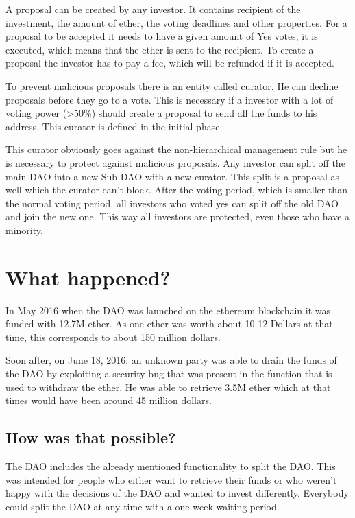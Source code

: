 \documentclass[a4paper, 11pt]{scrartcl}
\begin{document}
A proposal can be created by any investor. It contains recipient of the investment, the amount of ether, the voting deadlines and other properties. For a proposal to be accepted it needs to have a given amount of Yes votes, it is executed, which means that the ether is sent to the recipient. To create a proposal the investor has to pay a fee, which will be refunded if it is accepted. 

To prevent malicious proposals there is an entity called curator. He can decline proposals before they go to a vote. This is necessary if a investor with a lot of voting power (>50\%) should create a proposal to send all the funds to his address. This curator is defined in the initial phase.

This curator obviously goes against the non-hierarchical management rule but he is necessary to protect against malicious proposals. Any investor can split off the main DAO into a new Sub DAO with a new curator. This split is a proposal as well which the curator can't block. After the voting period, which is smaller than the normal voting period, all investors who voted yes can split off the old DAO and join the new one. This way all investors are protected, even those who have a minority.

\section{What happened?}

In May 2016 when the DAO was launched on the ethereum blockchain it was funded with 12.7M ether.
As one ether was worth about 10-12 Dollars at that time, this corresponds to about 150 million dollars.

Soon after, on June 18, 2016, an unknown party was able to drain the funds of the DAO by exploiting a security bug that was present in the function that is used to withdraw the ether.
He was able to retrieve 3.5M ether which at that times would have been around 45 million dollars.

\subsection{How was that possible?}

The DAO includes the already mentioned functionality to split the DAO.
This was intended for people who either want to retrieve their funds or who weren't happy with the decisions of the DAO and wanted to invest differently.
Everybody could split the DAO at any time with a one-week waiting period.
\end{document}
